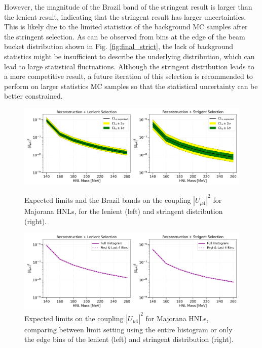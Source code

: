 However, the magnitude of the Brazil band of the stringent result is larger than the lenient result, indicating that the stringent result has larger uncertainties.
This is likely due to the limited statistics of the background MC samples after the stringent selection.
As can be observed from bins at the edge of the beam bucket distribution shown in Fig. \ref{fig:final_strict}, the lack of background statistics might be insufficient to describe the underlying distribution, which can lead to large statistical fluctuations.                                  
Although the stringent distribution leads to a more competitive result, a future iteration of this selection is recommended to perform on larger statistics MC samples so that the statistical uncertainty can be better constrained.

\begin{figure}[b!]
    \centering
    \includegraphics[width=\textwidth]{sensitivity_strict_loose}
    \caption{Expected limits and the Brazil bands on the coupling $|U_{\mu4}|^2$ for Majorana HNLs, for the lenient (left) and stringent distribution (right).}
    \label{fig:nupi0_reco_result}
\vspace{0.5cm}
    \centering
    \includegraphics[width=\textwidth]{sensitivity_full_edge}
    \caption{Expected limits on the coupling $|U_{\mu4}|^2$ for Majorana HNLs, comparing between limit setting using the entire histogram or only the edge bins of the lenient (left) and stringent distribution (right).}
    \label{fig:nupi0_reco_full_edge}
\end{figure}

